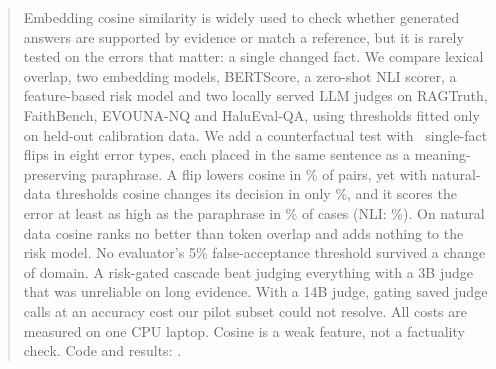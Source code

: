 \begin{abstract}
Embedding cosine similarity is widely used to check whether generated answers are supported by evidence or match a reference, but it is rarely tested on the errors that matter: a single changed fact. We compare lexical overlap, two embedding models, BERTScore, a zero-shot NLI scorer, a feature-based risk model and two locally served LLM judges on RAGTruth, FaithBench, EVOUNA-NQ and HaluEval-QA, using thresholds fitted only on held-out calibration data. We add a counterfactual test with \NCfPairs\ single-fact flips in eight error types, each placed in the same sentence as a meaning-preserving paraphrase. A flip lowers cosine in \CfCosDrop\% of pairs, yet with natural-data thresholds cosine changes its decision in only \CfCosDetect\%, and it scores the error at least as high as the paraphrase in \CfCosInv\% of cases (NLI: \CfNliInv\%). On natural data cosine ranks no better than token overlap and adds nothing to the risk model. No evaluator's 5\% false-acceptance threshold survived a change of domain. A risk-gated cascade beat judging everything with a 3B judge that was unreliable on long evidence. With a 14B judge, gating saved judge calls at an accuracy cost our pilot subset could not resolve. All costs are measured on one CPU laptop. Cosine is a weak feature, not a factuality check. Code and results: \CodeURL.
\end{abstract}
